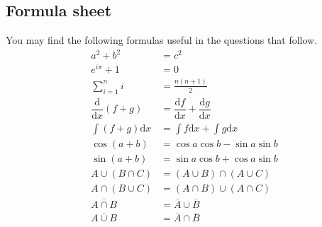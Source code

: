 \documentclass[12pt]{exam}
\newcommand{\dee}[1]{{\mathrm{d}#1}}
\newcommand{\diff}[2]{\dfrac{\dee{#1}}{\dee{#2}}}
\begin{document}
\vfill
\subsection*{Formula sheet}
You may find the following formulas useful in the questions that follow.
\begin{align*}
  a^2 + b^2 &= c^2 \\
  e^{i\pi}+1 &= 0 \\
  \sum_{i=1}^n i &= \frac{n(n+1)}{2} \\
  \diff{}{x}(f+g) &= \diff{f}{x}+\diff{g}{x} \\
  \int (f+g)\dee{x} &= \int f \dee{x} + \int g \dee{x} \\
  \cos(a+b) &= \cos a \cos b - \sin a \sin b \\
  \sin(a+b) &= \sin a \cos b + \cos a \sin b \\
  A \cup (B \cap C) &= (A\cup B) \cap (A \cup C) \\
  A \cap (B \cup C) &= (A\cap B) \cup (A \cap C) \\
  \overline{A \cap B} &= \overline{A} \cup \overline{B} \\
  \overline{A \cup B} &= \overline{A} \cap \overline{B}
\end{align*}
\vfill

\newpage
\end{document}
